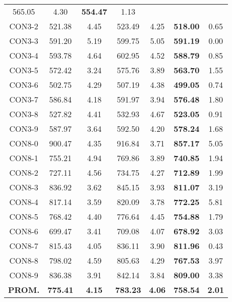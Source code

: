 \begin{table}[ht]
\begin{tabular}{c c c c c c c}
565.05 & 4.30 & \bf{554.47} & 
1.13\\CON3-2 & 521.38 & 4.45 & 
523.49 & 4.25 & \bf{518.00} & 
0.65\\CON3-3 & 591.20 & 5.19 & 
599.75 & 5.05 & \bf{591.19} & 
0.00\\CON3-4 & 593.78 & 4.64 & 
602.95 & 4.52 & \bf{588.79} & 
0.85\\CON3-5 & 572.42 & 3.24 & 
575.76 & 3.89 & \bf{563.70} & 
1.55\\CON3-6 & 502.75 & 4.29 & 
507.19 & 4.38 & \bf{499.05} & 
0.74\\CON3-7 & 586.84 & 4.18 & 
591.97 & 3.94 & \bf{576.48} & 
1.80\\CON3-8 & 527.82 & 4.41 & 
532.93 & 4.67 & \bf{523.05} & 
0.91\\CON3-9 & 587.97 & 3.64 & 
592.50 & 4.20 & \bf{578.24} & 
1.68\\CON8-0 & 900.47 & 4.35 & 
916.84 & 3.71 & \bf{857.17} & 
5.05\\CON8-1 & 755.21 & 4.94 & 
769.86 & 3.89 & \bf{740.85} & 
1.94\\CON8-2 & 727.11 & 4.56 & 
734.75 & 4.27 & \bf{712.89} & 
1.99\\CON8-3 & 836.92 & 3.62 & 
845.15 & 3.93 & \bf{811.07} & 
3.19\\CON8-4 & 817.14 & 3.59 & 
820.09 & 3.78 & \bf{772.25} & 
5.81\\CON8-5 & 768.42 & 4.40 & 
776.64 & 4.45 & \bf{754.88} & 
1.79\\CON8-6 & 699.47 & 3.41 & 
709.08 & 4.07 & \bf{678.92} & 
3.03\\CON8-7 & 815.43 & 4.05 & 
836.11 & 3.90 & \bf{811.96} & 
0.43\\CON8-8 & 798.02 & 4.59 & 
805.63 & 4.29 & \bf{767.53} & 
3.97\\CON8-9 & 836.38 & 3.91 & 
842.14 & 3.84 & \bf{809.00} & 
3.38\\\bf{PROM.} & 
\bf{775.41} & \bf{4.15} & \bf{783.23} & \bf{4.06} & \bf{758.54} & \bf{2.01}\\[1ex]\hline
\end{tabular}
\label{table:nonlin}
\end{table} \clearpage
